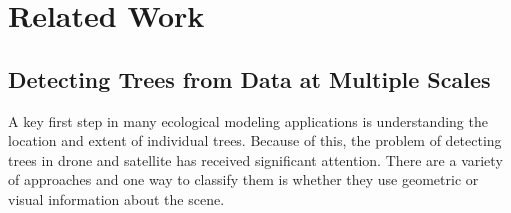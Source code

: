 
\chapter{Related Work} \label{chapRelated}



%
%





\section{Detecting Trees from Data at Multiple Scales}
A key first step in many ecological modeling applications is understanding the location and extent of individual trees. Because of this, the problem of detecting trees in drone and satellite has received significant attention. There are a variety of approaches and one way to classify them is whether they use geometric or visual information about the scene. 

